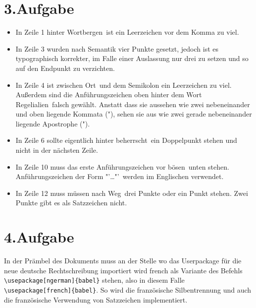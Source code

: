 \documentclass[12pt,a4paper]{article}
\begin{document}
\section{3.Aufgabe}
  
\begin{itemize}
    \item In Zeile 1 hinter \frqq Wortbergen\flqq~ist ein Leerzeichen vor dem Komma zu viel.
    \item In Zeile 3 wurden nach Semantik vier Punkte gesetzt, jedoch ist es typographisch
        korrekter, im Falle einer Auslassung nur drei zu setzen und so auf den Endpunkt zu verzichten.
    \item In Zeile 4 ist zwischen \frqq Ort\flqq~und dem Semikolon ein Leerzeichen zu viel. Außerdem     sind die Anführungszeichen oben hinter dem Wort \frqq Regelialien\flqq~falsch gewählt.
        Anstatt dass sie aussehen wie zwei nebeneinander und oben liegende Kommata ("), sehen sie aus wie zwei gerade nebeneinander liegende Apostrophe ("). 
    \item In Zeile 6 sollte eigentlich hinter \frqq beherrscht\flqq~ein Doppelpunkt stehen und nicht
        in der nächsten Zeile.
    \item In Zeile 10 muss das erste Anführungszeichen vor \frqq bösen\flqq~unten stehen. Anführungszeichen der
        Form "'\dots"'~werden im Englischen verwendet.
    \item In Zeile 12 muss müssen nach \frqq Weg\flqq~drei Punkte oder ein Punkt stehen. Zwei Punkte gibt es
        als Satzzeichen nicht.
\end{itemize}

\section{4.Aufgabe}
  
In der Prämbel des Dokuments muss an der Stelle wo das Userpackage für die neue deutsche Rechtschreibung importiert wird french als Variante des Befehls \verb+\usepackage[ngerman]{babel}+ stehen, also in diesem Falle \verb+\usepackage[french]{babel}+. So wird die französische Silbentrennung und auch die französische Verwendung von Satzzeichen implementiert.
\end{document}
